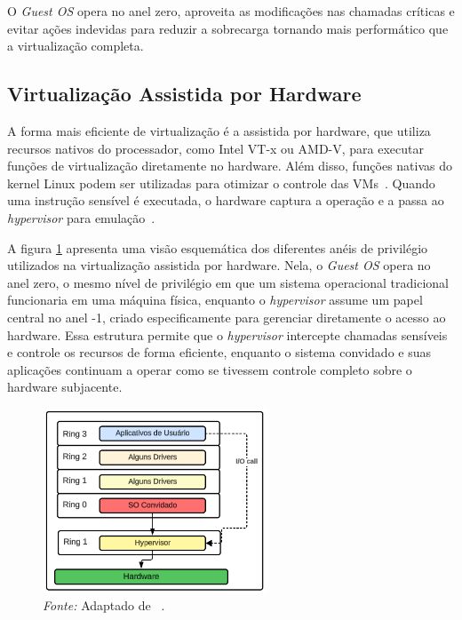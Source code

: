O \textit{Guest OS} opera no anel zero, aproveita as modificações nas chamadas críticas e evitar ações indevidas para reduzir a sobrecarga tornando mais performático que a virtualização completa.

\subsection{Virtualização Assistida por Hardware}

A forma mais eficiente de virtualização é a assistida por hardware, que utiliza recursos nativos do processador, como Intel VT-x ou AMD-V, para executar funções de virtualização diretamente no hardware. Além disso, funções nativas do kernel Linux podem ser utilizadas para otimizar o controle das VMs~\citep{chirammal2016mastering}. Quando uma instrução sensível é executada, o hardware captura a operação e a passa ao \textit{hypervisor} para emulação~\citep{modernOS}.

A figura \ref{fig:hardware_assisted_rings} apresenta uma visão esquemática dos diferentes anéis de privilégio utilizados na virtualização assistida por hardware. Nela, o \textit{Guest OS} opera no anel zero, o mesmo nível de privilégio em que um sistema operacional tradicional funcionaria em uma máquina física, enquanto o \textit{hypervisor} assume um papel central no anel -1, criado especificamente para gerenciar diretamente o acesso ao hardware. Essa estrutura permite que o \textit{hypervisor} intercepte chamadas sensíveis e controle os recursos de forma eficiente, enquanto o sistema convidado e suas aplicações continuam a operar como se tivessem controle completo sobre o hardware subjacente.

\begin{figure}[htbp]
  \centering
  \caption{Virtualização assistida por hardware nos anéis de segurança. A figura mostra o \textit{Guest OS} operando no anel 0 e o \textit{hypervisor} no anel -1, permitindo um gerenciamento eficiente do hardware e reduzindo a necessidade de emulação por software.}
  \includegraphics[width=0.6\textwidth]{images/hardware_assisted_rings.png}
  \caption*{\textit{Fonte:} Adaptado de ~\citep{chirammal2016mastering}.}
  \label{fig:hardware_assisted_rings}
\end{figure}

